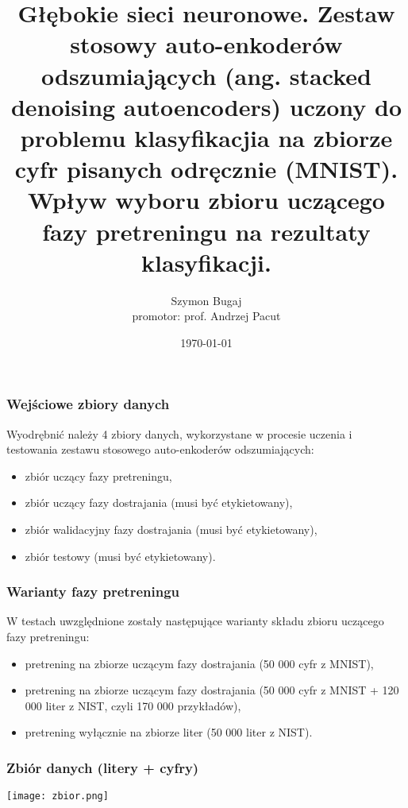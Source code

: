 \documentclass{beamer}
\title[Głębokie sieci neuronowe]{Głębokie sieci neuronowe. Zestaw stosowy auto-enkoderów odszumiających (ang. stacked denoising autoencoders) uczony do problemu klasyfikacjia na zbiorze cyfr pisanych odręcznie (MNIST). Wpływ wyboru zbioru uczącego fazy pretreningu na rezultaty klasyfikacji.} %
\author[]{Szymon Bugaj \\promotor: prof. Andrzej Pacut} %
\institute[] %
{
Politechnika Warszawska, Wydział Elektroniki i Technik Informacyjnych \\ %
\medskip
\textit{s.bugaj@mion.elka.pw.edu.pl} %
}
\date{\today} %
\begin{document}
\begin{frame}
\titlepage %
\end{frame}




\begin{frame}
\frametitle{Wejściowe zbiory danych}

Wyodrębnić należy 4 zbiory danych, wykorzystane w procesie uczenia i testowania zestawu stosowego auto-enkoderów odszumiających:
\begin{itemize}
    \item zbiór uczący fazy pretreningu,
    \item zbiór uczący fazy dostrajania (musi być etykietowany),
    \item zbiór walidacyjny fazy dostrajania (musi być etykietowany),
    \item zbiór testowy (musi być etykietowany).
\end{itemize}

\end{frame}


\begin{frame}
\frametitle{Warianty fazy pretreningu}
W testach uwzględnione zostały następujące warianty składu zbioru uczącego fazy pretreningu:

\begin{itemize}
    \item pretrening na zbiorze uczącym fazy dostrajania (50 000 cyfr z MNIST),
    \item pretrening na zbiorze uczącym fazy dostrajania (50 000 cyfr z MNIST + 120 000 liter z NIST, czyli 170 000 przykładów),
    \item pretrening wyłącznie na zbiorze liter (50 000 liter z NIST).
\end{itemize}



\end{frame}


\begin{frame}
\frametitle{Zbiór danych (litery + cyfry)}
\begin{center}
\texttt{[image: zbior.png]}
\end{center}

\end{frame}
\end{document}

